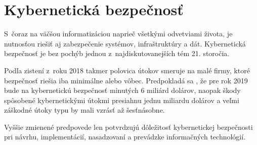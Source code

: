 \chapter{Kybernetická bezpečnosť}

S~čoraz na väčšou informatizáciou naprieč všetkými odvetviami života, je nutnosťou riešiť aj zabezpečenie systémov, infraštruktúry a dát. Kybernetická bezpečnosť je bez pochýb jednou z~najdiskutovanejších tém 21. storočia.
 
Podľa zistení z~roku 2018 \cite{Milkovich3122018} takmer polovica útokov smeruje na malé firmy, ktoré bezpečnosť riešia iba minimálne alebo vôbec. Predpokladá sa \cite{Milkovich3122018}, že pre rok 2019 bude na kybernetickú bezpečnosť minutých 6 miliárd dolárov, naopak škody spôsobené kybernetickými útokmi presiahnu jednu miliardu dolárov a veľmi záškodné útoky typu  by mali vzrásť až šesťnásobne. 

Vyššie zmienené predpovede len potvrdzujú dôležitosť kybernetickej  bezpečnosti pri návrhu, implementácií, nasadzovaní a prevádzke informačných technológií.




